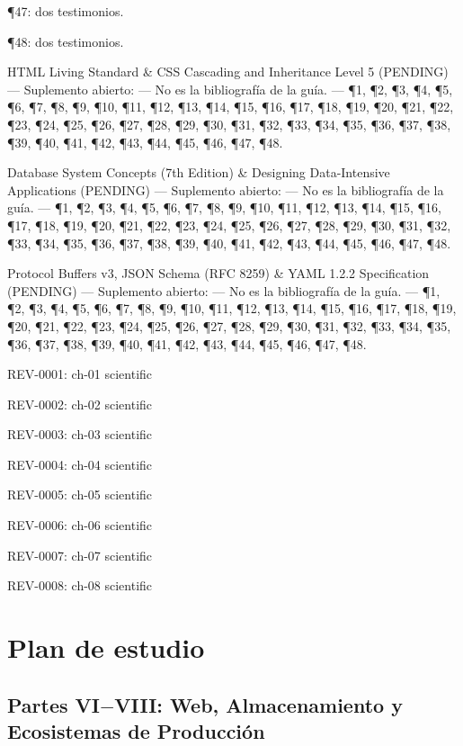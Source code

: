 \documentclass{book}
\begin{document}
\noindent ¶47: dos testimonios.

\noindent ¶48: dos testimonios.

\medskip

\noindent HTML Living Standard \& CSS Cascading and Inheritance Level 5 (PENDING) --- Suplemento abierto: --- No es la bibliografía de la guía. --- \P1, \P2, \P3, \P4, \P5, \P6, \P7, \P8, \P9, \P10, \P11, \P12, \P13, \P14, \P15, \P16, \P17, \P18, \P19, \P20, \P21, \P22, \P23, \P24, \P25, \P26, \P27, \P28, \P29, \P30, \P31, \P32, \P33, \P34, \P35, \P36, \P37, \P38, \P39, \P40, \P41, \P42, \P43, \P44, \P45, \P46, \P47, \P48.

\noindent Database System Concepts (7th Edition) \& Designing Data-Intensive Applications (PENDING) --- Suplemento abierto: --- No es la bibliografía de la guía. --- \P1, \P2, \P3, \P4, \P5, \P6, \P7, \P8, \P9, \P10, \P11, \P12, \P13, \P14, \P15, \P16, \P17, \P18, \P19, \P20, \P21, \P22, \P23, \P24, \P25, \P26, \P27, \P28, \P29, \P30, \P31, \P32, \P33, \P34, \P35, \P36, \P37, \P38, \P39, \P40, \P41, \P42, \P43, \P44, \P45, \P46, \P47, \P48.

\noindent Protocol Buffers v3, JSON Schema (RFC 8259) \& YAML 1.2.2 Specification (PENDING) --- Suplemento abierto: --- No es la bibliografía de la guía. --- \P1, \P2, \P3, \P4, \P5, \P6, \P7, \P8, \P9, \P10, \P11, \P12, \P13, \P14, \P15, \P16, \P17, \P18, \P19, \P20, \P21, \P22, \P23, \P24, \P25, \P26, \P27, \P28, \P29, \P30, \P31, \P32, \P33, \P34, \P35, \P36, \P37, \P38, \P39, \P40, \P41, \P42, \P43, \P44, \P45, \P46, \P47, \P48.

\noindent REV-0001: ch-01 scientific

\noindent REV-0002: ch-02 scientific

\noindent REV-0003: ch-03 scientific

\noindent REV-0004: ch-04 scientific

\noindent REV-0005: ch-05 scientific

\noindent REV-0006: ch-06 scientific

\noindent REV-0007: ch-07 scientific

\noindent REV-0008: ch-08 scientific
\chapter{Plan de estudio}

\section*{Partes VI\(-\)VIII: Web, Almacenamiento y Ecosistemas de Producción}
\end{document}

